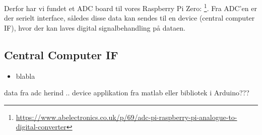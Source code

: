 Derfor har vi fundet et ADC board til vores Raspberry Pi Zero: \footnote{\url{https://www.abelectronics.co.uk/p/69/adc-pi-raspberry-pi-analogue-to-digital-converter}}. Fra ADC'en er der serielt interface, således disse data kan sendes til en device (central computer IF), hvor der kan laves digital signalbehandling på dataen.  

\subsection{Central Computer IF}
\begin{itemize}
    \item blabla
\end{itemize}
data fra adc herind .. device applikation fra matlab eller bibliotek i Arduino???
